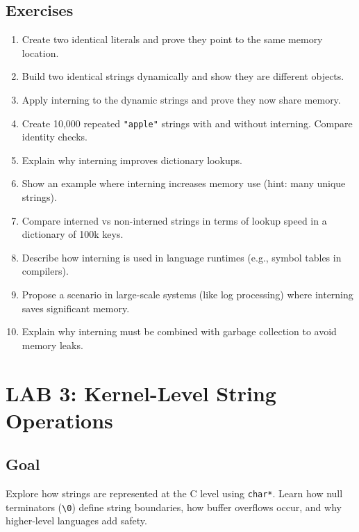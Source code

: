 \documentclass[
  letterpaper,
  DIV=11,
  numbers=noendperiod]{scrreprt}
\providecommand{\tightlist}{%
  \setlength{\itemsep}{0pt}\setlength{\parskip}{0pt}}
\begin{document}
\subsection{Exercises}\label{exercises-45}

\begin{enumerate}
\def\labelenumi{\arabic{enumi}.}
\tightlist
\item
  Create two identical literals and prove they point to the same memory
  location.
\item
  Build two identical strings dynamically and show they are different
  objects.
\item
  Apply interning to the dynamic strings and prove they now share
  memory.
\item
  Create 10,000 repeated \texttt{"apple"} strings with and without
  interning. Compare identity checks.
\item
  Explain why interning improves dictionary lookups.
\item
  Show an example where interning increases memory use (hint: many
  unique strings).
\item
  Compare interned vs non-interned strings in terms of lookup speed in a
  dictionary of 100k keys.
\item
  Describe how interning is used in language runtimes (e.g., symbol
  tables in compilers).
\item
  Propose a scenario in large-scale systems (like log processing) where
  interning saves significant memory.
\item
  Explain why interning must be combined with garbage collection to
  avoid memory leaks.
\end{enumerate}

\section{LAB 3: Kernel-Level String
Operations}\label{lab-3-kernel-level-string-operations}

\subsection{Goal}\label{goal-2}

Explore how strings are represented at the C level using \texttt{char*}.
Learn how null terminators
(\texttt{\textquotesingle{}\textbackslash{}0\textquotesingle{}}) define
string boundaries, how buffer overflows occur, and why higher-level
languages add safety.
\end{document}
